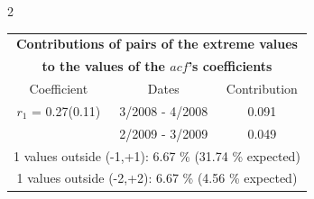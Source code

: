 
\thispagestyle{empty}
\begin{multicols}{2}{ 
\begin{tabular}{ccc}
\multicolumn{3}{c}{\textbf{Contributions of pairs of the extreme values} }  \vspace{-.10in}  \\ 
\multicolumn{3}{c}{ \textbf{to the values of the $acf$'s coefficients}} \\ 
\hline 
\hline                  Coefficient  &  Dates &  Contribution \\ 
\hline 
  $r_{ 1}$ = 0.27(0.11) &       3/2008 -  4/2008 &        0.091   \vspace{-.10in} \\  
&        2/2009 -  3/2009 &        0.049  \vspace{-.02in} \\ \hline 
\multicolumn{3}{c}{               1 values outside (-1,+1):  6.67  \% (31.74  \% expected)}\vspace{-.10in} \\ 
\multicolumn{3}{c}{               1 values outside (-2,+2):  6.67 \%  (4.56 \% expected) } \\
 \end{tabular} \\ 
 } 
\end{multicols} 
